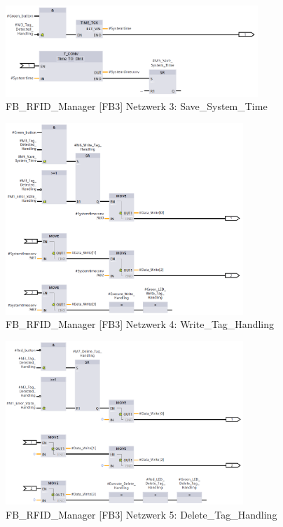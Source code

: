 \begin{figure}[h!]
	\centering
	\includegraphics[width=0.85\textwidth]{images/FBRFIDManagerNetzwerk3.png}
	\caption{FB\_RFID\_Manager [FB3] Netzwerk 3: Save\_System\_Time}
	\label{fig:FBRFIDManager[FB3]Netzwerk3}
\end{figure}
\begin{figure}[h!]
	\centering
	\includegraphics[width=0.8\textwidth]{images/FBRFIDManagerNetzwerk4.png}
	\caption{FB\_RFID\_Manager [FB3] Netzwerk 4: Write\_Tag\_Handling}
	\label{fig:FBRFIDManager[FB3]Netzwerk4}
\end{figure}
\begin{figure}[h!]
	\centering
	\includegraphics[width=0.8\textwidth]{images/FBRFIDManagerNetzwerk5.png}
	\caption{FB\_RFID\_Manager [FB3] Netzwerk 5: Delete\_Tag\_Handling}
	\label{fig:FBRFIDManager[FB3]Netzwerk5}
\end{figure}
